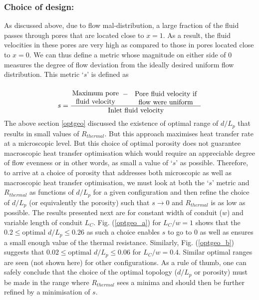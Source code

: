 \documentclass[twocolumn,10pt,cleanfoot]{ihmtc}
\begin{document}
\subsubsection*{Choice of design:} As discussed above, due to flow mal-distribution, a large fraction of the fluid passes through pores that are located close to $x=1$. As a result, the fluid velocities in these pores are very high as compared to those in pores located close to $x=0$. We can thus define a metric whose magnitude on either side of 0 measures the degree of flow deviation from the ideally desired uniform flow distribution. This metric `$ s $' is defined as
%
\[s = \frac{\parbox{7em}{\center{Maximum pore fluid velocity}}\,-\,\parbox{10em}{\center{Pore fluid velocity if flow were uniform}}}{\text{Inlet fluid velocity}}\]
%
The above section \ref{optgeo} discussed the existence of optimal range of $d/L_p$ that results in small values of $R_{thermal}$. But this approach maximises heat transfer rate at a microscopic level. But this choice of optimal porosity does not guarantee macroscopic heat transfer optimisation which would require an appreciable degree of flow evenness or in other words, as small a value of `$s$' as possible. Therefore, to arrive at a choice of porosity that addresses both microscopic as well as macroscopic heat transfer optimisation, we must look at both the `$s$' metric and $R_{thermal}$ as functions of $d/L_p$ for a given configuration and then refine the choice of $d/L_p$ (or equivalently the porosity) such that $s\rightarrow 0 $ and  $R_{thermal}$ is as low as possible. The results presented next are for constant width of conduit ($w$) and variable length of conduit $L_C$.
%
Fig. (\ref{optgeo_a}) for $L_C/w=1$ shows that the $0.2 \leq \text{optimal } d/L_p \leq 0.26$ as such a choice enables $s$ to go to 0 as well as ensures a small enough value of the thermal resistance. Similarly, Fig. (\ref{optgeo_b}) suggests that $0.02 \leq \text{optimal } d/L_p \leq 0.06$ for $L_C/w=0.4$. Similar optimal ranges are seen (not shown here) for other configurations. As a rule of thumb, one can safely conclude that the choice of the optimal topology ($d/L_p$ or porosity) must be made in the range where $R_{thermal}$ sees a minima and should then be further refined by a minimisation of $s$.
%
\end{document}
